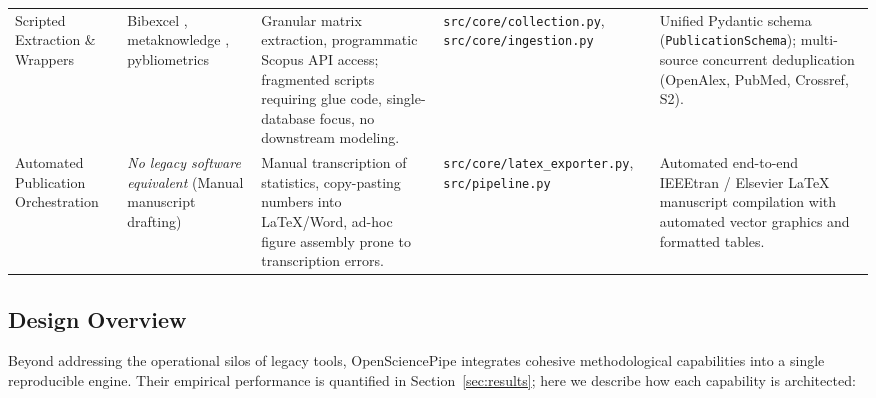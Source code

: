 \documentclass[preprint,12pt]{elsarticle}
\begin{document}
\begin{table}[t]
{\begin{tabular}{p{2.8cm}p{2.8cm}p{4.6cm}p{3.8cm}p{4.8cm}}
Scripted Extraction \& Wrappers & Bibexcel \cite{persson2009bibexcel}, metaknowledge \cite{mclevey2017metaknowledge}, pybliometrics \cite{rose2019pybliometrics} & Granular matrix extraction, programmatic Scopus API access; fragmented scripts requiring glue code, single-database focus, no downstream modeling. & \texttt{src/core/}\allowbreak\texttt{collection.py}, \texttt{src/core/}\allowbreak\texttt{ingestion.py} & Unified Pydantic schema (\texttt{PublicationSchema}); multi-source concurrent deduplication (OpenAlex, PubMed, Crossref, S2). \\
Automated Publication Orchestration & \textit{No legacy software equivalent} (Manual manuscript drafting) & Manual transcription of statistics, copy-pasting numbers into LaTeX/Word, ad-hoc figure assembly prone to transcription errors. & \texttt{src/core/}\allowbreak\texttt{latex\_exporter.py}, \texttt{src/pipeline.py} & Automated end-to-end IEEEtran / Elsevier LaTeX manuscript compilation with automated vector graphics and formatted tables. \\
\hline
\end{tabular}%
}
\end{table}

\subsection{Design Overview}
Beyond addressing the operational silos of legacy tools, OpenSciencePipe integrates cohesive methodological capabilities into a single reproducible engine. Their empirical performance is quantified in Section~\ref{sec:results}; here we describe how each capability is architected:
\end{document}
